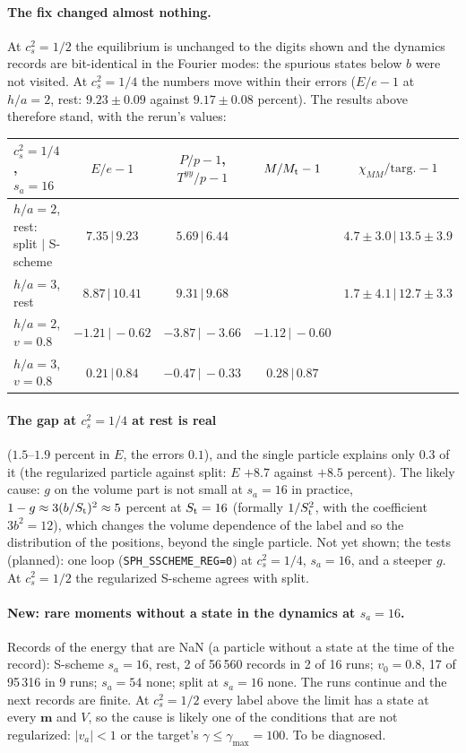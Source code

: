 \documentclass[11pt,aps,preprint,nofootinbib,superscriptaddress,tightenlines]{revtex4-2}
\let\oldparagraph\paragraph
\renewcommand{\paragraph}{\par\bigskip\oldparagraph}
\begin{document}
\paragraph{The fix changed almost nothing.}  At $c_s^2=1/2$ the equilibrium is unchanged to the digits shown and the dynamics records are
bit-identical in the Fourier modes: the spurious states below $b$ were not visited.  At $c_s^2=1/4$ the numbers move within their errors
($E/e-1$ at $h/a=2$, rest: $9.23\pm0.09$ against $9.17\pm0.08$ percent).  The results above therefore stand, with the rerun's values:
\begin{center}\footnotesize
\begin{tabular}{lcccc}
\toprule
$c_s^2=1/4$, $s_a=16$ & $E/e-1$ & $P/p-1$, $T^{yy}/p-1$ & $M/M_{\rm t}-1$ & $\chi_{MM}/\text{targ.}-1$ \\
\midrule
$h/a=2$, rest: split $|$ S-scheme & $7.35\,|\,9.23$ & $5.69\,|\,6.44$ & & $4.7\pm3.0\,|\,13.5\pm3.9$ \\
$h/a=3$, rest & $8.87\,|\,10.41$ & $9.31\,|\,9.68$ & & $1.7\pm4.1\,|\,12.7\pm3.3$ \\
$h/a=2$, $v=0.8$ & $-1.21\,|\,-0.62$ & $-3.87\,|\,-3.66$ & $-1.12\,|\,-0.60$ & \\
$h/a=3$, $v=0.8$ & $0.21\,|\,0.84$ & $-0.47\,|\,-0.33$ & $0.28\,|\,0.87$ & \\
\bottomrule
\end{tabular}
\end{center}
\paragraph{The gap at $c_s^2=1/4$ at rest is real} ($1.5$--$1.9$ percent in $E$, the errors $0.1$), and the single particle explains only $0.3$ of it (the
regularized particle against split: $E$ $+8.7$ against $+8.5$ percent).  The likely cause: $g$ on the volume part is not small at $s_a=16$ in practice,
$1-g\approx3(b/S_{\rm t})^2\approx5$ percent at $S_{\rm t}=16$ (formally $1/S_{\rm t}^2$, with the coefficient $3b^2=12$), which changes the volume dependence
of the label and so the distribution of the positions, beyond the single particle.  Not yet shown; the tests (planned): one loop
(\texttt{SPH\_SSCHEME\_REG=0}) at $c_s^2=1/4$, $s_a=16$, and a steeper $g$.  At $c_s^2=1/2$ the regularized S-scheme agrees with split.

\paragraph{New: rare moments without a state in the dynamics at $s_a=16$.}  Records of the energy that are NaN (a particle without a state at the time of
the record): S-scheme $s_a=16$, rest, 2 of 56\,560 records in 2 of 16 runs; $v_0=0.8$, 17 of 95\,316 in 9 runs; $s_a=54$ none; split at $s_a=16$ none.
The runs continue and the next records are finite.  At $c_s^2=1/2$ every label above the limit has a state at every $\bm m$ and $V$, so the cause is
likely one of the conditions that are not regularized: $|v_a|<1$ or the target's $\gamma\le\gamma_{\max}=100$.  To be diagnosed.
\end{document}
